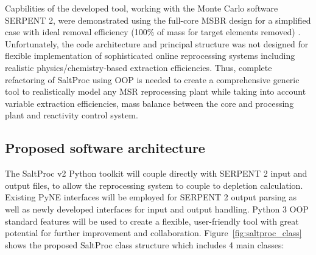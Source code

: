 Capbilities of the developed tool, working with the Monte Carlo software 
SERPENT 2, were demonstrated using the full-core MSBR design for a 
simplified case with ideal removal efficiency (100\% of mass for target 
elements removed) \cite{rykhlevskii_modeling_2019}. Unfortunately, 
the code architecture and principal structure was not designed for 
flexible implementation of sophisticated online reprocessing systems 
including realistic physics/chemistry-based extraction efficiencies. 
Thus, complete refactoring of SaltProc using \gls{OOP} is needed to 
create a comprehensive generic tool to realistically model any \gls{MSR} 
reprocessing plant while taking into account variable extraction 
efficiencies, mass balance between the core and processing plant and 
reactivity control system.

\subsection{Proposed software architecture}
The SaltProc v2 Python toolkit will couple directly with SERPENT 2 input 
and output files, 
to allow the reprocessing system to couple to depletion calculation. 
Existing PyNE interfaces will be employed for SERPENT 2 output parsing as 
well as newly developed interfaces for input and output handling. 
Python 3 \gls{OOP} 
standard features will be used to create a flexible, user-friendly tool with 
great potential for further improvement and collaboration. 
Figure~\ref{fig:saltproc_class} shows the proposed SaltProc class structure 
 which includes 4 main classes:
